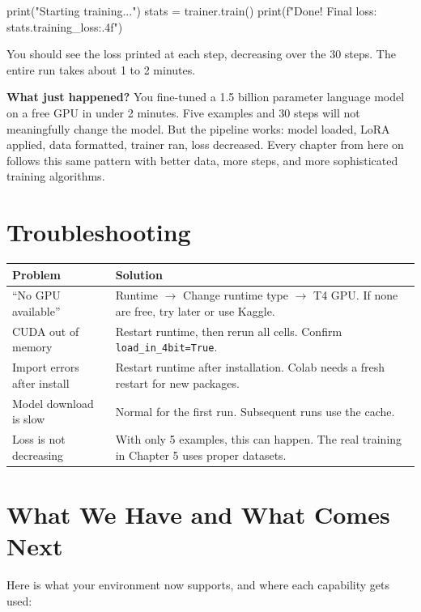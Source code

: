 \begin{chapterenv}
\begin{codeblock}[python]
print("Starting training...")
stats = trainer.train()
print(f"Done! Final loss: {stats.training_loss:.4f}")
\end{codeblock}

You should see the loss printed at each step, decreasing over the 30 steps. The entire run takes about 1 to 2 minutes.

\begin{infobox}
\textbf{What just happened?} You fine-tuned a 1.5 billion parameter language model on a free GPU in under 2 minutes. Five examples and 30 steps will not meaningfully change the model. But the pipeline works: model loaded, LoRA applied, data formatted, trainer ran, loss decreased. Every chapter from here on follows this same pattern with better data, more steps, and more sophisticated training algorithms.
\end{infobox}

\section{Troubleshooting}

\begin{center}
\begin{tabular}{p{}p{}}
\toprule
\textbf{Problem} & \textbf{Solution} \\
\midrule
``No GPU available'' & Runtime $\rightarrow$ Change runtime type $\rightarrow$ T4 GPU. If none are free, try later or use Kaggle. \\
CUDA out of memory & Restart runtime, then rerun all cells. Confirm \texttt{load\_in\_4bit=True}. \\
Import errors after install & Restart runtime after installation. Colab needs a fresh restart for new packages. \\
Model download is slow & Normal for the first run. Subsequent runs use the cache. \\
Loss is not decreasing & With only 5 examples, this can happen. The real training in Chapter 5 uses proper datasets. \\
\bottomrule
\end{tabular}
\end{center}

\section{What We Have and What Comes Next}

Here is what your environment now supports, and where each capability gets used:


\end{chapterenv}
